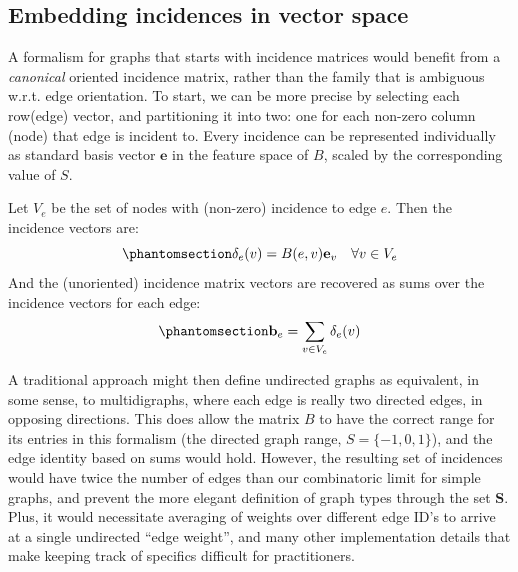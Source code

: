 \documentclass[%
	12pt,
		oneside,
		letterpaper
]{book}
\begin{document}
\subsection{Embedding incidences in vector space}\label{embedding-incidences-in-vector-space}

A formalism for graphs that starts with incidence matrices would benefit from a \emph{canonical} oriented incidence matrix, rather than the family that is ambiguous w.r.t. edge orientation.
To start, we can be more precise by selecting each row(edge) vector, and partitioning it into two: one for each non-zero column (node) that edge is incident to.
Every incidence can be represented individually as standard basis vector \(\mathbf{e}\) in the feature space of \(B\), scaled by the corresponding value of \(S\).

Let \(V_e\) be the set of nodes with (non-zero) incidence to edge \(e\).
Then the incidence vectors are:\\
\begin{equation}\phantomsection\label{eq-incidence-vec}{
\delta_e(v) = B(e,v)\mathbf{e}_v \quad \forall v\in V_e
}\end{equation}
And the (unoriented) incidence matrix vectors are recovered as sums over the incidence vectors for each edge:
\begin{equation}\phantomsection\label{eq-incidence-edge-sum}{
\mathbf{b}_e = \sum_{v\in V_e} \delta_e(v)
}\end{equation}

A traditional approach might then define undirected graphs as equivalent, in some sense, to multidigraphs, where each edge is really two directed edges, in opposing directions.
This does allow the matrix \(B\) to have the correct range for its entries in this formalism (the directed graph range, \(S=\{-1,0,1\}\)), and the edge identity based on sums would hold.
However, the resulting set of incidences would have twice the number of edges than our combinatoric limit for simple graphs, and prevent the more elegant definition of graph types through the set \(\mathbf{S}\).
Plus, it would necessitate averaging of weights over different edge ID's to arrive at a single undirected ``edge weight'', and many other implementation details that make keeping track of specifics difficult for practitioners.
\end{document}
